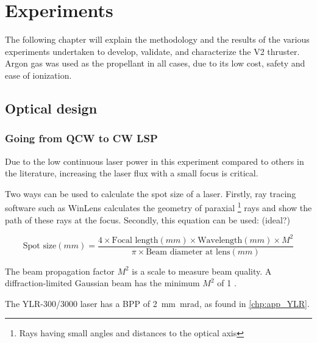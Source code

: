 \chapter{Experiments}

    The following chapter will explain the methodology and the results of the various experiments undertaken to develop, validate, and characterize the V2 thruster. Argon gas was used as the propellant in all cases, due to its low cost, safety and ease of ionization.

    \section{Optical design}

        \subsection{Going from QCW to CW LSP}
                
            Due to the low continuous laser power in this experiment compared to others in the literature, increasing the laser flux with a small focus is critical.

            Two ways can be used to calculate the spot size of a laser. Firstly, ray tracing software such as WinLens calculates the geometry of paraxial \footnote{Rays having small angles and distances to the optical axis} rays and show the path of these rays at the focus. Secondly, this equation \cite{LaserSpotSize} can be used: (ideal?)
            
            \[
            \text{Spot size}(mm) = \frac{4 \times \text{Focal length}(mm) \times \text{Wavelength}(mm) \times M^2}{\pi \times \text{Beam diameter at lens}(mm)}
            \]

            The beam propagation factor $M^2$ is a scale to measure beam quality. A diffraction-limited Gaussian beam has the minimum $M^2$ of 1 \cite{hechtUnderstandingLasersEntry2019}.
            
            The YLR-300/3000 laser has a BPP of \qty{2}{mm.mrad}, as found in \autoref{chp:app_YLR}.

